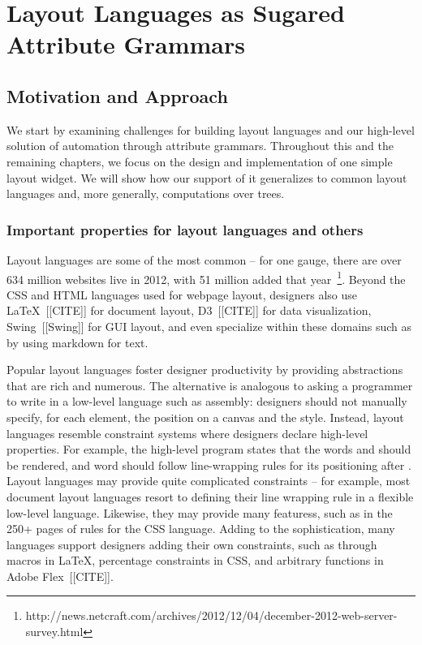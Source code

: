 \chapter{Layout Languages as Sugared Attribute Grammars}
\label{chap:2}
\section{Motivation and Approach}

We start by examining challenges for building layout languages and our high-level solution of automation through attribute grammars.  Throughout this and the remaining chapters, we focus on the design and implementation of one simple layout widget. We will show how our support of it generalizes to common layout languages and, more generally, computations over trees.

\subsection{Important properties for layout languages and others}
Layout languages are some of the most common -- for one gauge, there are over 634 million websites live in 2012, with 51 million added that year~\footnote{http://news.netcraft.com/archives/2012/12/04/december-2012-web-server-survey.html}. Beyond the CSS and HTML languages used for webpage layout, designers also use \LaTeX~[[CITE]] for document layout, D3~[[CITE]] for data visualization, Swing~[[Swing]] for GUI layout, and even specialize within these domains such as by using markdown for text. 


Popular layout languages foster designer productivity by providing abstractions that are rich and numerous.
The alternative is analogous to asking a programmer to write in a low-level language such as assembly: designers should not manually specify, for each element, the position on a canvas and the style. Instead, layout languages resemble constraint systems where designers  declare high-level properties. For example, the high-level program  states that the words  and  should be rendered, and word  should follow line-wrapping rules for its positioning after . Layout languages may provide quite complicated constraints -- for example, most document layout languages resort to defining their line wrapping rule  in a flexible low-level language. Likewise, they may provide many featuress, such as in the 250+ pages of rules for the CSS language. Adding to the sophistication, many languages support designers adding their own constraints, such as through macros in \LaTeX,  percentage constraints in CSS, and arbitrary functions in Adobe Flex~[[CITE]]. 

